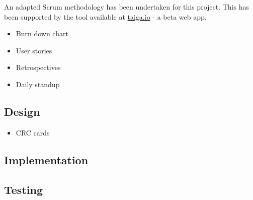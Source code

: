 An adapted Scrum methodology has been undertaken for this project. This has been supported by the tool available at \url{taiga.io} - a beta web app.

\begin{itemize}
  \item Burn down chart
  \item User stories
  \item Retrospectives
  \item Daily standup
\end{itemize}

\subsection{Design}

\begin{itemize}
\item CRC cards
\end{itemize}

\subsection{Implementation}

\subsection{Testing}
